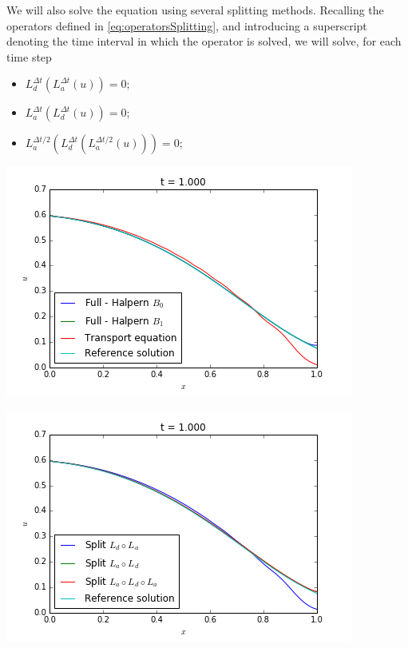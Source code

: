 \indent We will also solve the equation using several splitting methods.  Recalling the operators defined in \eqref{eq:operatorsSplitting}, and introducing a superscript denoting the time interval in which the operator is solved, we will solve, for each time step

\begin{itemize}
	\item $L_d^{\Delta t}(L_a^{\Delta t}(u)) = 0$;
	\item $L_a^{\Delta t}(L_d^{\Delta t}(u)) = 0$;
	\item $L_a^{\Delta t/2}(L_d^{\Delta t}(L_a^{\Delta t/2}(u))) = 0$;
\end{itemize}

\noindent\begin{minipage}{\textwidth} 
	\begin{minipage}{.5\textwidth} 
		\includegraphics[scale=.48]{figures/secondCase1A.png}	
	\end{minipage}
	\begin{minipage}{.5\linewidth}
		\includegraphics[scale=.48]{figures/secondCase1B.png}	

\end{minipage}
\end{minipage}
